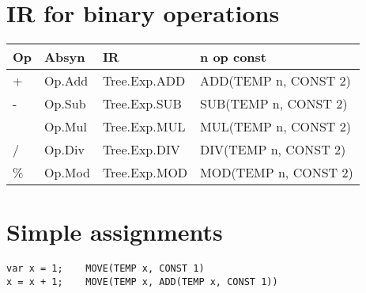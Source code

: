 \section*{IR for binary operations}
\begin{tabular}{>{\ttfamily}l|>{\ttfamily}l>{\ttfamily}l>{\ttfamily}l }
  \hline
  Op & Absyn & IR & n op const      \\
  \hline
  +     & Op.Add & Tree.Exp.ADD & ADD(TEMP n, CONST 2) \\
  -     & Op.Sub & Tree.Exp.SUB & SUB(TEMP n, CONST 2) \\
  *     & Op.Mul & Tree.Exp.MUL & MUL(TEMP n, CONST 2) \\
  /     & Op.Div & Tree.Exp.DIV & DIV(TEMP n, CONST 2) \\
  \%    & Op.Mod & Tree.Exp.MOD & MOD(TEMP n, CONST 2) \\
  \hline
\end{tabular}
\section*{Simple assignments}
\begin{lstlisting}[frame=single]
var x = 1;    MOVE(TEMP x, CONST 1)
x = x + 1;    MOVE(TEMP x, ADD(TEMP x, CONST 1))
\end{lstlisting}

